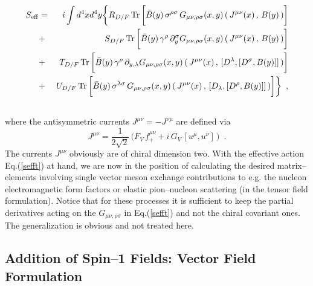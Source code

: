 \begin{eqnarray}
S_{\rm eff} &  = & i  \int  d^4x  d^4y
  \biggl\{ R_{D/F} \, {\rm Tr} \, \biggl[ \bar{B}(y) \, \sigma^{\rho \sigma} \,
G_{\mu \nu , \rho \sigma} (x,y) \, ( \, J^{\mu \nu} (x) \, , \, B(y)
\, ) \biggr] \nonumber \\
& + &  S_{D/F} \, {\rm Tr} \, \biggl[ \bar{B}(y) \, \gamma^\rho \,
\partial^\sigma_y G_{\mu \nu , \rho \sigma} (x,y) \, ( \, J^{\mu \nu}
(x) \, , \, B(y) \, ) \biggr] \nonumber \\
& + & T_{D/F} \, {\rm Tr} \, \biggl[ \bar{B}(y) \, \gamma^\rho \,
\partial_{y,\lambda} G_{\mu \nu , \rho \sigma} (x,y) \, ( \, J^{\mu \nu}
(x) \, , \, [ D^\lambda , [D^\sigma ,B(y)]] \, ) \biggr] \nonumber \\
&  + & U_{D/F} \, {\rm Tr} \, \biggl[ \bar{B}(y) \, \sigma^{\lambda \sigma} \,
G_{\mu \nu , \rho \sigma} (x,y) \, ( \, J^{\mu \nu} (x) \, , \,
[D_\lambda , [ D^\rho , B(y) ]] \, ) \biggr] \biggr\} \, \, \, ,
\nonumber \\ & &
\label{sefft}
\end{eqnarray}
where the antisymmetric currents $J^{\mu \nu}= -J^{\nu \mu}$ are defined via
\begin{equation}
J^{\mu \nu} = \frac{1}{2 \sqrt{2} } \, \biggl( F_V \,
f_+^{\mu \nu} + i \, G_V \, [u^\mu , u^\nu] \, \biggr) \,
\, \, . \label{Jt}
\end{equation}
The currents $J^{\mu \nu}$ obviously are of chiral dimension two. With
the effective action Eq.(\ref{sefft}) at hand, we are now in the
position of calculating the desired matrix--elements involving single
vector meson exchange contributions to e.g. the nucleon electromagnetic
form factors or elastic pion--nucleon scattering (in the tensor field
formulation). Notice that for these processes it is sufficient to keep
the partial derivatives acting on the $G_{\mu \nu , \rho \sigma}$
in Eq.(\ref{sefft}) and not the chiral covariant ones. The generalization is
obvious and not treated here.

\subsection{Addition of Spin--1 Fields: Vector Field Formulation}

